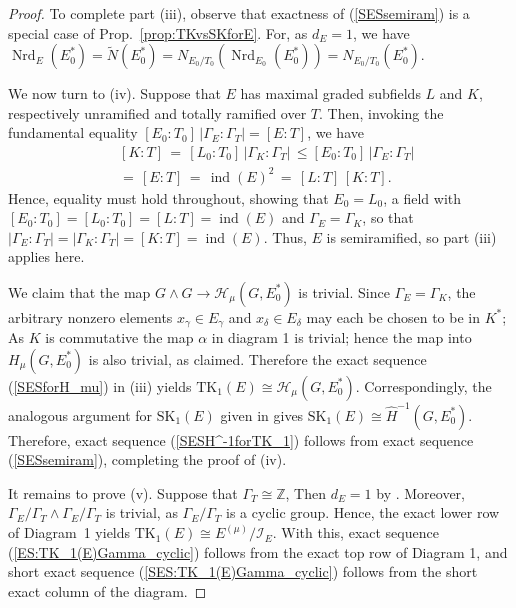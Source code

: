 \documentclass[11pt]{article}
\numberwithin{equation}{section}
\theoremstyle{plain}
\theoremstyle{remark}
\newcommand{\opn}{\operatorname}
\newcommand{\SK}{\opn{SK_1}}
\newcommand{\TK}{\opn{TK_1}}
\newcommand{\Nrd}{\opn{Nrd}}
\newcommand{\zz}{\mathbb Z}
\newcommand{\wt}{\widetilde}
\begin{document}
\begin{proof}
To complete part \textup{(iii)}, observe that exactness of (\ref{SESsemiram}) is a special case of 
Prop.~\ref{prop:TKvsSKforE}. 
For, as $d_E = 1$,
we have 
$\Nrd_E(E_0^*) = \wt N(E_0^*) = N_{E_0/T_0} ( \Nrd_{E_0}(E_0^*)) = N_{E_0/T_0}(E_0^*)$.


We now turn to  \textup{(iv)}. Suppose that $E$ has maximal graded subfields $L$ and $K$, respectively unramified and 
totally ramified over $T$. Then, invoking the fundamental equality $ {[E_0:T_0]\,|\Gamma_E:\Gamma_T|  = [E:T]} $, we have
\begin{align*}
[L:T]\,&[K:T] \, = \, [L_0:T_0]\,|\Gamma_K:\Gamma_T| \, \le [E_0:T_0]\,|\Gamma_E:\Gamma_T|  \\ 
\, &= \,[E:T] \,
= \, \opn{ind}(E)^2\, = \, [L:T]\,[K:T].
\end{align*}
Hence, equality must hold throughout, showing that $E_0 = L_0$, a field with $[E_0:T_0] = [L_0:T_0] = [L:T]= \opn{ind}(E)$
and $\Gamma_E = \Gamma_K$, so that $|\Gamma_E:\Gamma_T| = |\Gamma_K:\Gamma_T| = [K:T] = \opn{ind}(E)$.
Thus, $E$ is semiramified, so part (iii) applies here.
 

We claim that the map $G\wedge G\to\mathcal H_\mu(G,E_0^*)$ is trivial. 
Since $\Gamma_E = \Gamma_K$, the arbitrary nonzero elements $x_\gamma \in E_\gamma$ and $x_\delta \in E_\delta$
may each be chosen to be in $K^*$; 
As $K$ is commutative  the map $\alpha$ in 
diagram 1 is trivial;  hence the map into  $H_\mu(G,E_0^*)$ is also trivial, as claimed.
Therefore the exact sequence (\ref{SESforH_mu}) in \textup{(iii)} yields $\mathrm{TK}_1(E)\cong \mathcal H_\mu(G,E_0^*)$.
Correspondingly, the analogous argument for $\SK(E)$ given in \cite[Cor.~3.6(iv)]{hazrat-wadsworth-2011} gives 
$\SK(E) \cong  \widehat H^{-1}(G,E_0^*)$.  Therefore, exact sequence (\ref{SESH^-1forTK_1}) follows from 
exact sequence (\ref{SESsemiram}), completing the proof of  \textup{(iv)}.

It remains to prove \textup{(v)}.  Suppose that $\Gamma_T \cong\zz$,  Then $d_E = 1$ by 
\cite[Prop.~8.49]{tignol-wadsworth-2015}.  Moreover, $\Gamma_E/\Gamma_T \wedge \Gamma_E/\Gamma_T$
is trivial, as $\Gamma_E/\Gamma_T$ is a cyclic group.  Hence, the exact lower row of Diagram~1 yields
$\TK(E) \cong E^{(\mu)}/\mathcal I_E$. With this, exact sequence (\ref{ES:TK_1(E)Gamma_cyclic}) follows 
from the exact top row of Diagram 1,  and short exact sequence (\ref{SES:TK_1(E)Gamma_cyclic}) follows from the 
short exact column of the diagram.   
\end{proof}
\end{document}
